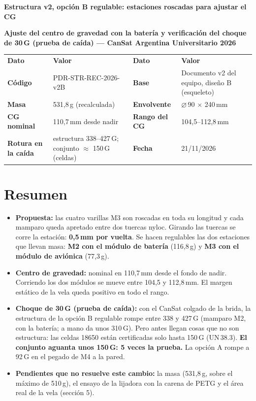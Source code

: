\documentclass[10pt,a4paper]{article}
\newcommand{\diam}{\ensuremath{\varnothing}}
\begin{document}
\begin{tcolorbox}[colback=celeste,colframe=azul,boxrule=0.6pt,arc=0pt]
{\large\bfseries\color{azul} Estructura v2, opción B regulable: estaciones roscadas para ajustar el CG\par}\smallskip
{\bfseries Ajuste del centro de gravedad con la batería y verificación del choque de 30\,G (prueba de caída) ---
CanSat Argentina Universitario 2026\par}
\end{tcolorbox}
\par{\small\noindent\begin{tabularx}{\linewidth}{P{2.8cm}LP{2.8cm}L}
\color{white}\bfseries Dato & \color{white}\bfseries Valor & \color{white}\bfseries Dato & \color{white}\bfseries Valor \\
\bfseries Código & PDR-STR-REC-2026-v2B & \bfseries Base & Documento v2 del equipo, diseño B (esqueleto) \\
\bfseries Masa & 531,8\,g (recalculada) & \bfseries Envolvente & \diam\,90 $\times$ 240\,mm \\
\bfseries CG nominal & 110,7\,mm desde nadir & \bfseries Rango del CG & 104,5--112,8\,mm \\
\bfseries Rotura en la caída & estructura 338--427\,G; conjunto $\approx$ 150\,G (celdas) & \bfseries Fecha & 21/11/2026 \\
\end{tabularx}}
\par\medskip
\section*{Resumen}
\begin{itemize}
\item \textbf{Propuesta:} las cuatro varillas M3 son roscadas en toda su longitud y cada mamparo queda apretado entre dos
tuercas nyloc. Girando las tuercas se corre la estación: \textbf{0,5\,mm por vuelta}. Se hacen regulables las dos estaciones
que llevan masa: \textbf{M2 con el módulo de batería} (116,8\,g) y \textbf{M3 con el módulo de
aviónica} (77,3\,g).
\item \textbf{Centro de gravedad:} nominal en 110,7\,mm desde el fondo de nadir. Corriendo los dos
módulos se mueve entre 104,5 y 112,8\,mm. El margen estático de la vela
queda positivo en todo el rango.
\item \textbf{Choque de 30\,G (prueba de caída):} con el CanSat colgado de la brida, la estructura de la opción B regulable
rompe entre 338 y 427\,G (mamparo M2, con la batería; a mano
da unos 310\,G). Pero antes llegan cosas que no son estructura: las celdas 18650 están certificadas solo hasta 150\,G
(UN\,38.3). \textbf{El conjunto aguanta unos 150\,G: 5 veces la prueba.} La opción A rompe a 92\,G en
el pegado de M4 a la pared.
\item \textbf{Pendientes que no resuelve este cambio:} la masa (531,8\,g, sobre el máximo de 510\,g),
el ensayo de la lijadora con la carena de PETG y el área real de la vela (sección 5).
\end{itemize}
\end{document}
